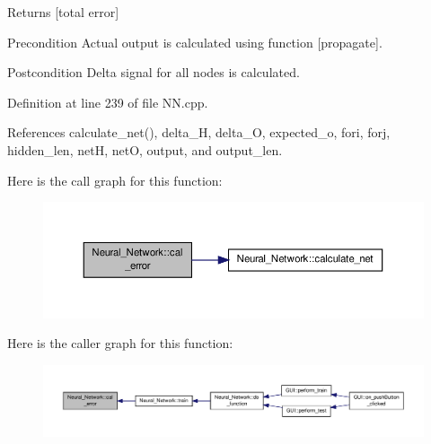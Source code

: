 \begin{DoxyReturn}{Returns}
\mbox{[}total error\mbox{]} 
\end{DoxyReturn}
\begin{DoxyPrecond}{Precondition}
Actual output is calculated using function \mbox{[}propagate\mbox{]}. 
\end{DoxyPrecond}
\begin{DoxyPostcond}{Postcondition}
Delta signal for all nodes is calculated. 
\end{DoxyPostcond}


Definition at line 239 of file N\-N.\-cpp.



References calculate\-\_\-net(), delta\-\_\-\-H, delta\-\_\-\-O, expected\-\_\-o, fori, forj, hidden\-\_\-len, net\-H, net\-O, output, and output\-\_\-len.



Here is the call graph for this function\-:\nopagebreak
\begin{figure}[H]
\begin{center}
\leavevmode
\includegraphics[width=350pt]{d1/d7c/a00003_a3e503ddab5bbc51f6e0b79b67ca6ed2f_cgraph}
\end{center}
\end{figure}




Here is the caller graph for this function\-:\nopagebreak
\begin{figure}[H]
\begin{center}
\leavevmode
\includegraphics[width=350pt]{d1/d7c/a00003_a3e503ddab5bbc51f6e0b79b67ca6ed2f_icgraph}
\end{center}
\end{figure}



